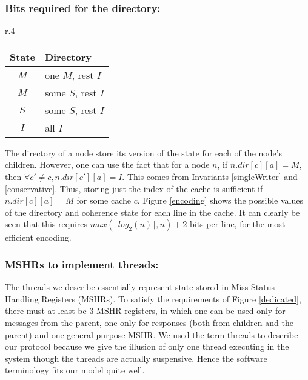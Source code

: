 \subsubsection{Bits required for the directory:}
\begin{wrapfigure}{r}{.4\linewidth}
\begin{tabularx}{\linewidth}{|c|X|}
\hline
State & Directory \\
\hline
$M$ & one $M$, rest $I$\\
$M$ & some $S$, rest $I$\\
$S$ & some $S$, rest $I$\\
$I$ & all $I$\\
\hline
\end{tabularx}
\caption{Possible values of coherence state and directory for each cache line}
\label{encoding}
\end{wrapfigure}
The directory of a node store its version of the state for each of the node's
children. However, one can use the fact that for a node $n$, if $n.dir[c][a] =
M$, then $\forall c' \neq c, n.dir[c'][a] = I$. This comes from Invariants
\ref{singleWriter} and \ref{conservative}. Thus, storing just the index of the
cache is sufficient if $n.dir[c][a] = M$ for some cache $c$. Figure
\ref{encoding} shows the possible values of the directory and coherence state
for each line in the cache. It can clearly be seen that this requires
$max(\lceil log_2(n)\rceil, n) + 2$ bits per line, for the most efficient
encoding.

\subsubsection{MSHRs to implement threads:}
The threads we describe essentially represent state stored in Miss Status Handling Registers (MSHRs). To
satisfy the requirements of Figure \ref{dedicated}, there must at least be 3
MSHR registers, in which one can be used only for messages from the parent, one
only for responses (both from children and the parent) and one general purpose
MSHR. We used the term threads to describe our protocol because we give the
illusion of only one thread executing in the system though the threads are
actually suspensive. Hence the software terminology fits our model quite well.
